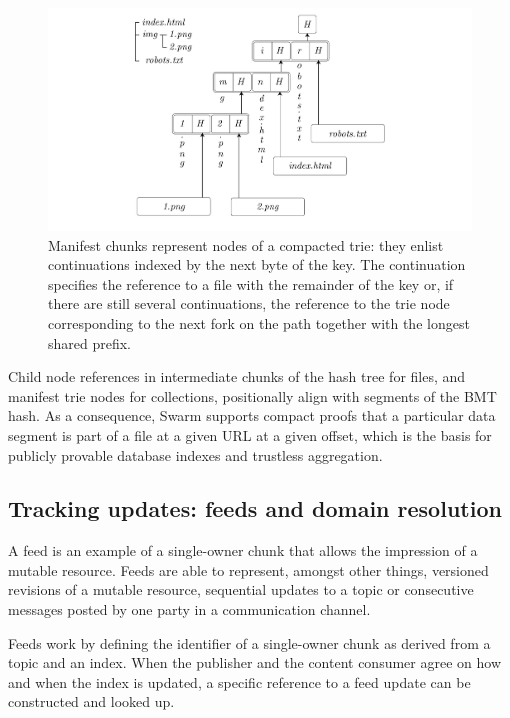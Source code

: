 \documentclass[12pt,a4paper]{article}
\begin{document}
\begin{figure}[!ht]
\centering
\includegraphics[width=\textwidth]{fig2/manifest-structure.pdf}
\caption[Manifests]{Manifest chunks represent nodes of a compacted trie: they enlist continuations indexed by the next byte of the key. The continuation specifies the reference to a file with the remainder of the key or, if there are still several continuations, the reference to the trie node corresponding to the next fork on the path together with the longest shared prefix.}
\label{fig:manifest-structure}
\end{figure}


Child node references in intermediate chunks of the hash tree for files, and manifest trie nodes for collections, positionally align with segments of the BMT hash. As a consequence, Swarm supports compact proofs that a particular data segment is part of a file at a given URL at a given offset, which is the basis for publicly provable database indexes and trustless aggregation.


\subsection{Tracking updates: feeds and domain resolution}

A feed is an example of a single-owner chunk that allows the impression of a mutable resource. Feeds are able to represent, amongst other things, versioned revisions of a mutable resource, sequential updates to a topic or consecutive messages posted by one party in a communication channel. 

Feeds work by defining the identifier of a single-owner chunk as derived from a topic and an index. When the publisher and the content consumer agree on how and when the index is updated, a specific reference to a feed update can be constructed and looked up.
\end{document}
